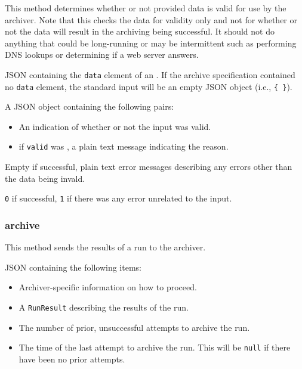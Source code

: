 \documentclass[10pt,titlepage]{article}
\begin{document}
This method determines whether or not provided data is valid for use
by the archiver.  Note that this checks the data for validity only and
not for whether or not the data will result in the archiving being
successful.  It should not do anything that could be long-running or
may be intermittent such as performing DNS lookups or determining if a
web server answers.

 JSON containing the {\tt data} element of
an .  If the archive specification
contained no {\tt data} element, the standard input will be an empty
JSON object (i.e., {\tt \{ \}}).

 A JSON object containing the following pairs:

\begin{itemize}
\item {} An indication of whether or not the
  input was valid.

\item {} if {\tt valid} was \false, a plain
  text message indicating the reason.
\end{itemize}


 Empty if successful, plain text error
messages describing any errors other than the data being invald.

 {\tt 0} if successful, {\tt 1} if there was
any error unrelated to the input.


\subsubsection{archive}

This method sends the results of a run to the archiver.

 JSON containing the following items:


\begin{itemize}
\item {} Archiver-specific information on how to proceed.

\item {} A {\tt RunResult} describing
  the results of the run.

\item {} The number of prior, unsuccessful
  attempts to archive the run.

\item {} The time of the last attempt
  to archive the run.  This will be {\tt null} if there have been no
  prior attempts.
\end{itemize}
\end{document}
